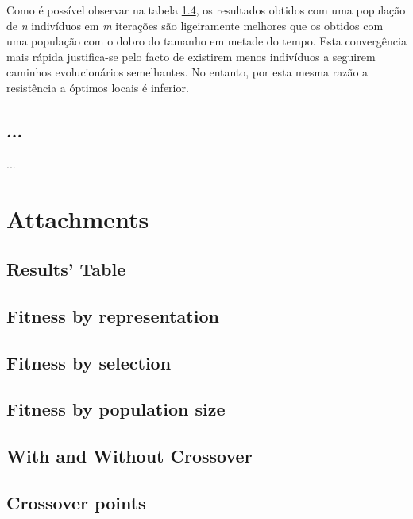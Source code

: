 \documentclass[a4paper]{article}
\begin{document}
\indent Como é possível observar na tabela \ref{sec:fitness_by_population_size}, os resultados obtidos com uma
população de \emph{n} indivíduos em \emph{m} iterações são ligeiramente melhores que os obtidos
com uma população com o dobro do tamanho em metade do tempo. Esta convergência mais rápida justifica-se
pelo facto de existirem menos indivíduos a seguirem caminhos evolucionários semelhantes. No entanto, por esta
mesma razão a resistência a óptimos locais é inferior.
 
\cleardoublepage

\subsection{...}
\indent \indent ...

\cleardoublepage

\eject \pdfpagewidth=594.0mm \pdfpageheight=420.0mm
\paperwidth=594.0mm
\paperheight=420.0mm

\section{Attachments}

\subsection{Results' Table}
\label{sec:results}
\begin{center}
	
\end{center}

\eject \pdfpagewidth=210.0mm \pdfpageheight=297.0mm

\subsection{Fitness by representation}
\label{sec:fitness_by_representation}


\subsection{Fitness by selection}
\label{sec:fitness_by_selection}


\subsection{Fitness by population size}
\label{sec:fitness_by_population_size}


\subsection{With and Without Crossover}
\label{sec:crossover_on_off}


\subsection{Crossover points}
\label{sec:crossover_points}

\end{document}
